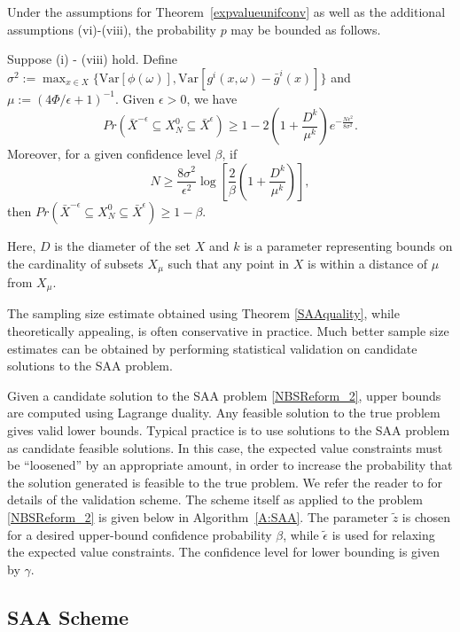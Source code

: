 Under the assumptions for Theorem~\ref{expvalueunifconv} as well as the
additional assumptions (vi)-(viii), the probability $p$ may be bounded
as follows.
\begin{theorem} \cite{wang_sample_2008} \label{SAAquality}
	Suppose (i) - (viii) hold. Define $\sigma^2 := \max_{x \in X}
	\{ \text{Var}[\phi(\omega)], \text{Var}[g^i(x,\omega) - \bar{g}^i(x)] \}$ and
	$\mu := (4 \Phi/ \epsilon + 1)^{-1}$. Given $\epsilon > 0$, we have 
	\[ Pr(\bar{X}^{-\epsilon} \subseteq X_N^0 \subseteq \bar{X}^{\epsilon}) \geq 1 -
	2\left( 1 + \frac{D^k}{\mu^k} \right) e^{-\frac{N \epsilon^2}{8 \sigma^2}}. \]
	Moreover, for a given confidence level $\beta$, if 
	\[ N \geq \frac{8 \sigma^2}{\epsilon^2} \log \left[ \frac{2}{\beta} \left( 1 +
	\frac{D^k}{\mu^k} \right) \right], \]
	then $  Pr(\bar{X}^{-\epsilon} \subseteq X_N^0 \subseteq \bar{X}^{\epsilon})
	\geq 1 - \beta$.
\end{theorem}
Here, $D$ is the diameter of the set $X$ and $k$ is a parameter representing
bounds on the cardinality of subsets $X_{\mu}$ such that any point in $X$ is
within a distance of $\mu$ from $X_{\mu}$.

The sampling size estimate obtained using Theorem \ref{SAAquality}, while
theoretically appealing, is often conservative in practice. Much better sample
size estimates can be obtained by performing statistical validation on candidate
solutions to the SAA problem.

Given a candidate solution to the SAA problem \eqref{NBSReform_2}, upper bounds
are computed using Lagrange duality. Any feasible solution to the true problem
gives valid lower bounds. Typical practice is to use solutions to the SAA
problem as candidate feasible solutions. In this case, the expected value
constraints must be ``loosened'' by an appropriate amount, in order to increase
the probability that the solution generated is feasible to the true problem.
We refer the reader to \cite{wang_sample_2008} for details of the
validation scheme. The scheme itself as applied to the problem
\eqref{NBSReform_2} is given below in Algorithm~\ref{A:SAA}. The parameter
$\tilde{z}$ is chosen for a desired upper-bound confidence probability $\beta$,
while $\tilde{\epsilon}$ is used for relaxing the expected value constraints.
The confidence level for lower bounding is given by $\gamma$.

\subsection*{SAA Scheme}

